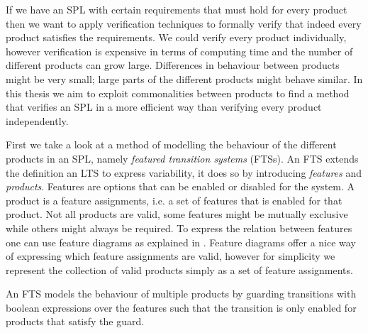 If we have an SPL with certain requirements that must hold for every product then we want to apply verification techniques to formally verify that indeed every product satisfies the requirements. We could verify every product individually, however verification is expensive in terms of computing time and the number of different products can grow large. Differences in behaviour between products might be very small; large parts of the different products might behave similar. In this thesis we aim to exploit commonalities between products to find a method that verifies an SPL in a more efficient way than verifying every product independently.

First we take a look at a method of modelling the behaviour of the different products in an SPL, namely \textit{featured transition systems} (FTSs). An FTS extends the definition an LTS to express variability, it does so by introducing \textit{features} and \textit{products}. Features are options that can be enabled or disabled for the system. A product is a feature assignments, i.e. a set of features that is enabled for that product. Not all products are valid, some features might be mutually exclusive while others might always be required. To express the relation between features one can use feature diagrams as explained in \cite{Classen2013FeaturedTS}. Feature diagrams offer a nice way of expressing which feature assignments are valid, however for simplicity we represent the collection of valid products simply as a set of feature assignments. 

An FTS models the behaviour of multiple products by guarding transitions with boolean expressions over the features such that the transition is only enabled for products that satisfy the guard.

